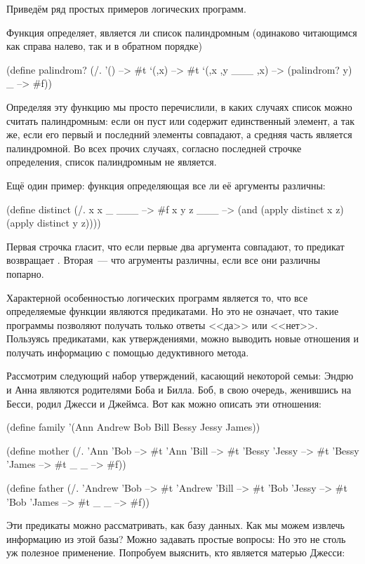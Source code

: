 Приведём ряд простых примеров логических программ.

Функция  определяет, является ли список палиндромным (одинаково читающимся как справа налево, так и в обратном порядке)

\begin{SchemeCode}[emph={x,y}]
(define palindrom?
  (/. '() --> #t
      `(,x) --> #t
      `(,x ,y ___ ,x) --> (palindrom? y)
      _ --> #f))
\end{SchemeCode}

Определяя эту функцию мы просто перечислили, в каких случаях список можно считать палиндромным: если он пуст или содержит единственный элемент, а так же, если его первый и последний элементы совпадают, а средняя часть является палиндромной. Во всех прочих случаях, согласно последней строчке определения, список палиндромным не является.

Ещё один пример: функция  определяющая все ли её аргументы различны:

\begin{SchemeCode}
(define distinct
  (/. x x _ ___ --> #f
      x y z ___ --> (and (apply distinct x z)
                         (apply distinct y z))))
\end{SchemeCode}

Первая строчка гласит, что если первые два аргумента совпадают, то предикат возвращает . Вторая~--- что агрументы различны, если все они различны попарно.

Характерной особенностью логических программ является то, что все определяемые функции являются предикатами. Но это не означает, что такие программы позволяют получать только ответы <<да>> или <<нет>>. Пользуясь предикатами, как утверждениями, можно выводить новые отношения и получать информацию с помощью дедуктивного метода.

Рассмотрим следующий набор утверждений, касающий некоторой семьи:
Эндрю и Анна являются родителями Боба и Билла. Боб, в свою очередь, женившись на Бесси, родил Джесси и Джеймса. Вот как можно описать эти отношения:

\begin{Definition}
(define family '(Ann Andrew Bob Bill Bessy Jessy James))

(define mother
  (/. 'Ann 'Bob --> #t
      'Ann 'Bill --> #t
      'Bessy 'Jessy --> #t
      'Bessy 'James --> #t
      _ _ --> #f))

(define father
  (/. 'Andrew 'Bob --> #t
      'Andrew 'Bill --> #t
      'Bob 'Jessy --> #t
      'Bob 'James --> #t
      _ _ --> #f))
\end{Definition}
Эти предикаты можно рассматривать, как базу данных. Как мы можем извлечь информацию из этой базы? Можно задавать простые вопросы:
Но это не столь уж полезное применение. Попробуем выяснить, кто является матерью Джесси:


